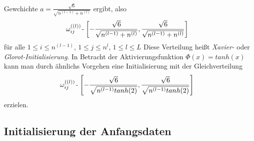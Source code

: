 Gewchichte $a=\frac{\sqrt {6}}{\sqrt {n^{(l-1)} + n^{(l)}}}$ ergibt, also
\[
    \omega_{ij}^{((l))} \raisebox{-0.9ex}{\~{}}
    \left[ -\frac{\sqrt {6}}{\sqrt {n^{(l-1)} + n^{(l)}}}, \frac{\sqrt {6}}{\sqrt {n^{(l-1)} + n^{(l)}}} \right]
\]
für alle $1\leq i \leq n^{(l-1)}$, $1\leq j \leq n^{l}$, $1\leq l \leq L$ Diese Verteilung heißt \textit{Xavier-} oder
\textit{Glorot-Initialisierung}. In Betracht der Aktivierungsfunktion $\Phi(x)=tanh(x)$ kann man durch ähnlichs Vorgehen
eine Initialisierung mit der Gleichverteilung
\[
    \omega_{ij}^{((l))} \raisebox{-0.9ex}{\~{}}
    \left[ -\frac{\sqrt {6}}{\sqrt {n^{(l-1)} tanh(2)}}, \frac{\sqrt {6}}{\sqrt {n^{(l-1)} tanh(2)}} \right]
\]
erzielen.

\subsection{Initialisierung der Anfangsdaten}
\label{subsec:intiialisierungderanfangsdaten}

